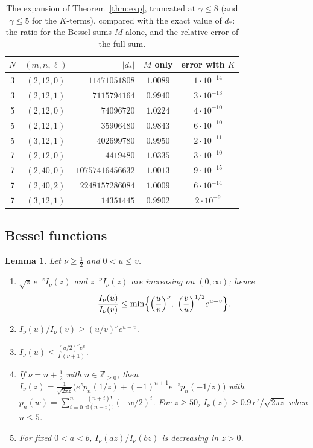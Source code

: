 \documentclass[11pt]{amsart}
\numberwithin{equation}{section}
\theoremstyle{plain}
\newtheorem{lem}[thm]{Lemma}
\theoremstyle{definition}
\theoremstyle{remark}
\newcommand{\Z}{\mathbb{Z}}
\begin{document}
\begin{table}[t]
\centering
\caption{The expansion of Theorem~\ref{thm:exp}, truncated at $\gamma\le8$ (and $\gamma\le5$ for the $K$-terms), compared with the exact value of $d_*$: the ratio for the Bessel sums $M$ alone, and the relative error of the full sum.}
\label{tab:check}
\begin{tabular}{ccrcc}
\toprule
$N$&$(m,n,\ell)$&$|d_*|$&$M$ only&error with $K$\\
\midrule
3&$(2,12,0)$&$11471051808$&$1.0089$&$1\cdot10^{-14}$\\
3&$(2,12,1)$&$7115794164$&$0.9940$&$3\cdot10^{-13}$\\
5&$(2,12,0)$&$74096720$&$1.0224$&$4\cdot10^{-10}$\\
5&$(2,12,1)$&$35906480$&$0.9843$&$6\cdot10^{-10}$\\
5&$(3,12,1)$&$402699780$&$0.9950$&$2\cdot10^{-11}$\\
7&$(2,12,0)$&$4419480$&$1.0335$&$3\cdot10^{-10}$\\
7&$(2,40,0)$&$10757416456632$&$1.0013$&$9\cdot10^{-15}$\\
7&$(2,40,2)$&$2248157286084$&$1.0009$&$6\cdot10^{-14}$\\
7&$(3,12,1)$&$14351445$&$0.9902$&$2\cdot10^{-9}$\\
\bottomrule
\end{tabular}
\end{table}

\subsection{Bessel functions}
\begin{lem}\label{lem:bessel}
Let $\nu\ge\frac12$ and $0<u\le v$.
\begin{enumerate}
\item[(a)] $\sqrt z\,e^{-z}I_\nu(z)$ and $z^{-\nu}I_\nu(z)$ are increasing on $(0,\infty)$; hence
\[\frac{I_\nu(u)}{I_\nu(v)}\le\min\Bigl\{\Bigl(\frac uv\Bigr)^\nu,\ \Bigl(\frac vu\Bigr)^{1/2}e^{u-v}\Bigr\}.\]
\item[(b)] $I_\nu(u)/I_\nu(v)\ge(u/v)^{\nu}e^{u-v}$.
\item[(c)] $I_\nu(u)\le\frac{(u/2)^\nu e^u}{\Gamma(\nu+1)}$.
\item[(d)] If $\nu=n+\frac12$ with $n\in\Z_{\ge0}$, then $I_\nu(z)=\frac{1}{\sqrt{2\pi z}}\bigl(e^zp_n(1/z)+(-1)^{n+1}e^{-z}p_n(-1/z)\bigr)$ with $p_n(w)=\sum_{i=0}^n\frac{(n+i)!}{i!(n-i)!}(-w/2)^i$. For $z\ge50$, $I_\nu(z)\ge0.9\,e^z/\sqrt{2\pi z}$ when $n\le5$.
\item[(e)] For fixed $0<a<b$, $I_\nu(az)/I_\nu(bz)$ is decreasing in $z>0$.
\end{enumerate}
\end{lem}
\end{document}
